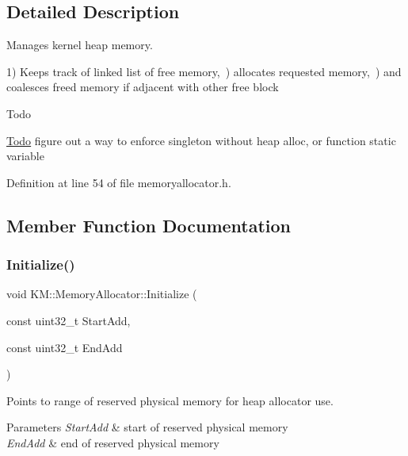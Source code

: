 \subsection{Detailed Description}
Manages kernel heap memory. 

1) Keeps track of linked list of free memory,~) allocates requested memory,~) and coalesces freed memory if adjacent with other free block \begin{DoxyRefDesc}{Todo}
\item[\hyperlink{todo__todo000001}{Todo}]figure out a way to enforce singleton without heap alloc, or function static variable \end{DoxyRefDesc}


Definition at line 54 of file memoryallocator.\+h.



\subsection{Member Function Documentation}
\mbox{\label{class_k_m_1_1_memory_allocator_acf0f1026d4b06044f1e4f21735ce6e5a}} 
\subsubsection{\texorpdfstring{Initialize()}{Initialize()}}
{\footnotesize\ttfamily void K\+M\+::\+Memory\+Allocator\+::\+Initialize (\begin{DoxyParamCaption}\item[{const uint32\+\_\+t}]{Start\+Add,  }\item[{const uint32\+\_\+t}]{End\+Add }\end{DoxyParamCaption})}



Points to range of reserved physical memory for heap allocator use. 


\begin{DoxyParams}{Parameters}
{\em Start\+Add} & start of reserved physical memory \\
\hline
{\em End\+Add} & end of reserved physical memory \\
\hline
\end{DoxyParams}


